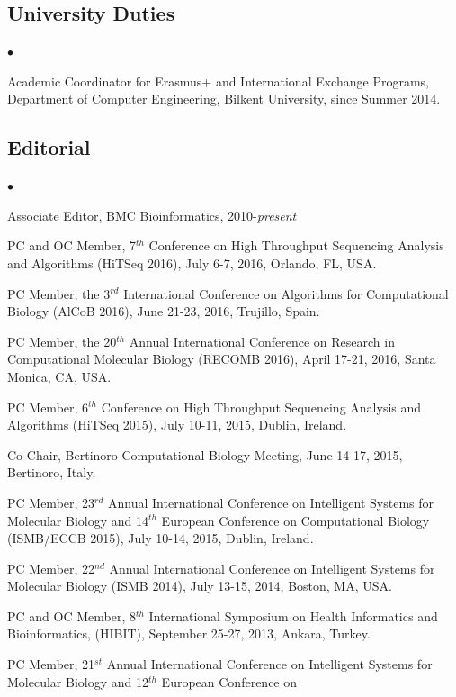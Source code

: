 \documentclass[margin,line]{res}
\newenvironment{list2}{
  \begin{list}{$\bullet$}{%
      \setlength{\itemsep}{0in}
      \setlength{\parsep}{0in} \setlength{\parskip}{0in}
      \setlength{\topsep}{0in} \setlength{\partopsep}{0in} 
      \setlength{\leftmargin}{0.2in}}}{\end{list}}
\begin{document}
\begin{resume}
\subsection{\small \sc University Duties}
\begin{list2}
\item
  Academic Coordinator for Erasmus+ and International Exchange Programs, Department of Computer Engineering, Bilkent University, since Summer 2014.
\end{list2}
\vspace{-0.6cm}

\subsection{\small \sc Editorial}
\begin{list2}
\item
  Associate Editor, BMC Bioinformatics, 2010-{\it present}
\item
  PC and OC Member, 7$^{th}$ Conference on High Throughput Sequencing Analysis and Algorithms (HiTSeq 2016), July 6-7, 2016, Orlando, FL, USA.
\item
  PC Member, the 3$^{rd}$ International Conference on Algorithms for Computational Biology (AlCoB 2016),
  June 21-23, 2016, Trujillo, Spain.
\item
  PC Member, the 20$^{th}$ Annual International Conference on Research in Computational Molecular Biology
  (RECOMB 2016), April 17-21, 2016, Santa Monica, CA, USA.
\item
  PC Member, 6$^{th}$ Conference on High Throughput Sequencing Analysis and Algorithms (HiTSeq 2015), July 10-11, 2015, Dublin, Ireland.
\item
  Co-Chair, Bertinoro Computational Biology Meeting, June 14-17, 2015, Bertinoro, Italy.
\item
  PC Member, 23$^{rd}$ Annual International Conference on Intelligent Systems for Molecular Biology and 14$^{th}$ European Conference on 
  Computational Biology  (ISMB/ECCB 2015), 
  July 10-14, 2015, Dublin, Ireland.
\item
  PC Member, 22$^{nd}$ Annual International Conference on Intelligent Systems for Molecular Biology 
  (ISMB 2014), 
  July 13-15, 2014, Boston, MA, USA.
\item
  PC and OC Member, 8$^{th}$  International Symposium on Health Informatics and Bioinformatics, (HIBIT),
  September 25-27, 2013, Ankara, Turkey.
\item
  PC Member, 21$^{st}$ Annual International Conference on Intelligent Systems for Molecular Biology and 12$^{th}$ European Conference on 

\end{list2}
\end{resume}
\end{document}
